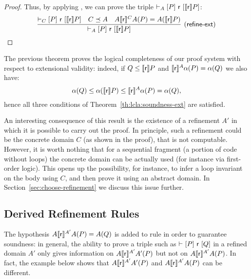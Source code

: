 \begin{proof}
	Thus, by applying , we can prove the triple $\vdash_{A}\nobreak[P]~\mathsf{r}~[\llbracket\mathsf{r}\rrbracket P]$:
	\[
	\infer[(\mathsf{refine\mbox{-}ext})]
	{\lcl{A}{P}{\regr}{\denot{\regr} P}}
	{\lcl{C}{P}{\regr}{\denot{\regr} P} & C \preceq A & A \denot{\regr}^{C} A(P) = A(\denot{\regr} P)}
	\]
\end{proof}

The previous theorem proves the logical completeness of our proof system with respect to extensional validity: indeed, if $Q \le \llbracket\mathsf{r}\rrbracket P$ and $\llbracket\mathsf{r}\rrbracket^A \alpha(P) = \alpha(Q)$ we also have:
\begin{align*}
	\alpha(Q) \le \alpha(\llbracket\mathsf{r}\rrbracket P) \le \llbracket\mathsf{r}\rrbracket^{A} \alpha(P) = \alpha(Q) ,
\end{align*}
hence all three conditions of Theorem~\ref{th:lcla:soundness-ext} are satisfied.

An interesting consequence of this result is the existence of a refinement $A'$ in which it is possible to carry out the proof. In principle, such a refinement could be the concrete domain $C$ (as shown in the proof), that is not computable. However, it is worth nothing that for a sequential fragment (a portion of code without loops) the concrete domain can be actually used (for instance via first-order logic). This opens up the possibility, for instance, to infer a loop invariant on the body using $C$, and then prove it using an abstract domain.
In Section~\ref{sec:choose-refinement} we discuss this issue further.

\subsection{Derived Refinement Rules}\label{sec:lcla:derived-rules}

The hypothesis $A \llbracket\mathsf{r}\rrbracket^{A'} A(P) = A(Q)$ is added to rule  in order to guarantee soundness: in general, the ability to prove a triple such as $\vdash_{}\nobreak[P]~\mathsf{r}~[Q]$ in a refined domain $A'$ only gives information on $A \llbracket\mathsf{r}\rrbracket^{A'} A'(P)$ but not on $A \llbracket\mathsf{r}\rrbracket^{A'} A(P)$. In fact, the example below shows that $A \llbracket\mathsf{r}\rrbracket^{A'} A'(P) $ and $A \llbracket\mathsf{r}\rrbracket^{A'} A(P)$ can be different.


